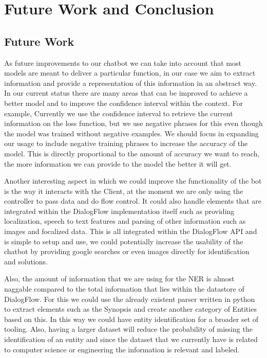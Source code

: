 \chapter{Future Work and Conclusion}

\section{Future Work}
As future improvements to our chatbot we can take into account that most models are meant to deliver a particular function, in our case we aim to extract information and provide a representation of this information in an abstract way. In our current status there are many areas that can be improved to achieve a better model and to improve the confidence interval within the context. For example, Currently we use the confidence interval to retrieve the current information on the loss function, but we use negative phrases for this even though the model was trained without negative examples. We should focus in expanding our usage to include negative training phrases to increase the accuracy of the model. This is directly proportional to the amount of accuracy we want to reach, the more information we can provide to the model the better it will get.

Another interesting aspect in which we could improve the functionality of the bot is the way it interacts with the Client, at the moment we are only using the controller to pass data and do flow control. It could also handle elements that are integrated within the DialogFlow implementation itself such as providing localization, speech to text features and parsing of other information such as images and focalized data. This is all integrated within the DialogFlow API and is simple to setup and use, we could potentially increase the usability of the chatbot by providing google searches or even images directly for identification and solutions.

Also, the amount of information that we are using for the NER is almost naggable compared to the total information that lies within the datastore of DialogFlow. For this we could use the already existent parser written in python to extract elements such as the Synopsis and create another category of Entities based on this. In this way we could have entity identification for a broader set of tooling. Also, having a larger dataset will reduce the probability of missing the identification of an entity and since the dataset that we currently have is related to computer science or engineering the information is relevant and labeled.

